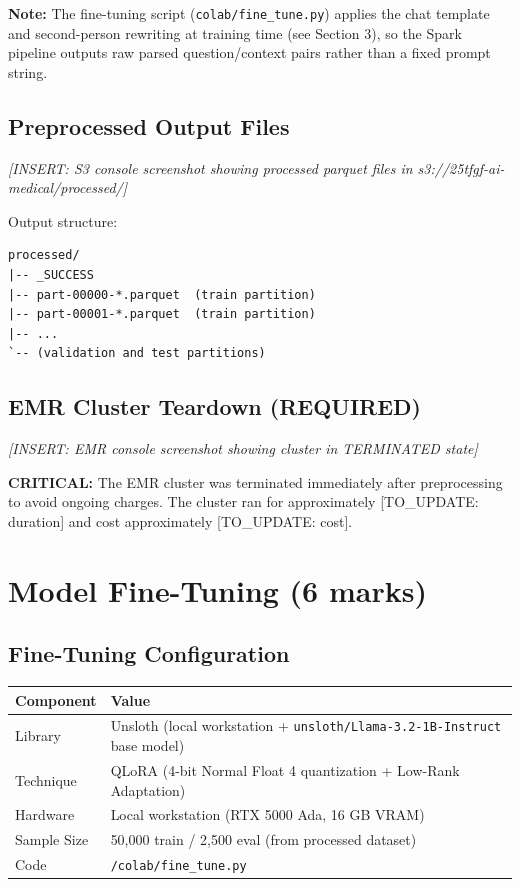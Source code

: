 \documentclass[11pt,a4paper]{article}
\begin{document}
\textbf{Note:} The fine-tuning script (\texttt{colab/fine\_tune.py}) applies the chat template and second-person rewriting at training time (see Section 3), so the Spark pipeline outputs raw parsed question/context pairs rather than a fixed prompt string.

\subsection{Preprocessed Output Files}

\textit{[INSERT: S3 console screenshot showing processed parquet files in s3://25tfgf-ai-medical/processed/]}

Output structure:
\begin{lstlisting}
processed/
|-- _SUCCESS
|-- part-00000-*.parquet  (train partition)
|-- part-00001-*.parquet  (train partition)
|-- ...
`-- (validation and test partitions)
\end{lstlisting}

\subsection{EMR Cluster Teardown (REQUIRED)}

\textit{[INSERT: EMR console screenshot showing cluster in TERMINATED state]}

\textbf{CRITICAL:} The EMR cluster was terminated immediately after preprocessing to avoid ongoing charges. The cluster ran for approximately [TO\_UPDATE: duration] and cost approximately [TO\_UPDATE: cost].

\section{Model Fine-Tuning (6 marks)}

\subsection{Fine-Tuning Configuration}

\begin{table}[H]
\centering
\begin{tabular}{@{}ll@{}}
\toprule
\textbf{Component} & \textbf{Value} \\
\midrule
Library & Unsloth (local workstation + \texttt{unsloth/Llama-3.2-1B-Instruct} base model) \\
Technique & QLoRA (4-bit Normal Float 4 quantization + Low-Rank Adaptation) \\
Hardware & Local workstation (RTX 5000 Ada, 16 GB VRAM) \\
Sample Size & 50,000 train / 2,500 eval (from processed dataset) \\
Code & \texttt{/colab/fine\_tune.py} \\
\bottomrule
\end{tabular}
\end{table}
\end{document}
